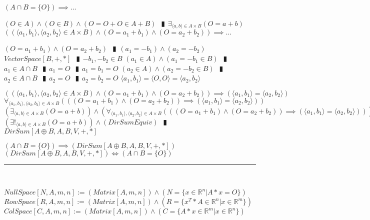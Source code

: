\documentclass{book}
\newcommand{\abr}{:=}
\newcommand{\pipe}{$\phantom{(}\vrectangleblack\phantom{)}$}
\newcommand{\pr}[1]{\left(#1\right)}
\begin{document}
\begin{shaded}
\begin{enumerate}
  \lit $(A \cap B = \{O\}) \implies \ldots$
  \begin{enumerate}
    \lit $(O \in A) \land (O \in B) \land (O = O + O \in A + B)$ \pipe $\exists_{\langle a, b \rangle \in A \times B}(O = a + b)$
    \lit $\pr{(\langle a_1, b_1 \rangle, \langle a_2, b_2 \rangle \in A \times B) \land (O = a_1 + b_1) \land (O = a_2 + b_2)} \implies \ldots$
    \begin{enumerate}
      \lit $(O = a_1 + b_1) \land (O = a_2 + b_2)$ \pipe $(a_1 = -b_1) \land (a_2 = -b_2)$
      \lit $VectorSpace[B, +, *]$ \pipe $-b_1, -b_2 \in B$
      \lit $(a_1 \in A) \land (a_1 = -b_1 \in B)$ \pipe $a_1 \in A \cap B$ \pipe $a_1 = O$ \pipe $a_1 = b_1 = O$
      \lit $(a_2 \in A) \land (a_2 = -b_2 \in B)$ \pipe $a_2 \in A \cap B$ \pipe $a_2 = O$ \pipe $a_2 = b_2 = O$
      \lit $\langle a_1, b_1 \rangle = \langle O, O \rangle = \langle a_2, b_2 \rangle$
    \end{enumerate}
    \lit $\pr{(\langle a_1, b_1 \rangle, \langle a_2, b_2 \rangle \in A \times B) \land (O = a_1 + b_1) \land (O = a_2 + b_2)} \implies (\langle a_1, b_1 \rangle = \langle a_2, b_2 \rangle)$
    \lit $\forall_{\langle a_1, b_1 \rangle, \langle a_2, b_2 \rangle \in A \times B}\pr{\pr{(O = a_1 + b_1) \land (O = a_2 + b_2)} \implies (\langle a_1, b_1 \rangle = \langle a_2, b_2 \rangle)}$
    \lit $\pr{\exists_{\langle a, b \rangle \in A \times B}(O = a + b)} \land \pr{\forall_{\langle a_1, b_1 \rangle, \langle a_2, b_2 \rangle \in A \times B}\pr{\pr{(O = a_1 + b_1) \land (O = a_2 + b_2)} \implies (\langle a_1, b_1 \rangle = \langle a_2, b_2 \rangle)}}$
    \lit $\pr{\exists!_{\langle a, b \rangle \in A \times B}(O = a + b)} \land (DirSumEquiv)$ \pipe $DirSum[A \oplus B, A, B, V, +, *]$
  \end{enumerate}
  \lit $(A \cap B = \{O\}) \implies (DirSum[A \oplus B, A, B, V, +, *])$
  \lit $(DirSum[A \oplus B, A, B, V, +, *]) \iff (A \cap B = \{O\})$
\end{enumerate} \vspace{.75mm} \hrule \vspace{.75mm} \ \\
\end{shaded} %

$NullSpace[N, A, m, n] \abr (Matrix[A, m, n]) \land (N = \{x \in \mathbb{R}^n | A * x = O\})$ \\  %
$RowSpace[R, A, m, n] \abr (Matrix[A, m, n]) \land (R = \{x^T * A \in \mathbb{R}^n | x \in \mathbb{R}^m\})$ \\  %
$ColSpace[C, A, m, n] \abr (Matrix[A, m, n]) \land (C = \{A * x \in \mathbb{R}^m | x \in \mathbb{R}^n\})$ \\  %
\end{document}
